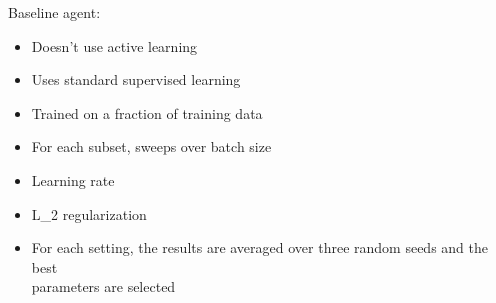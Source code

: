 \documentclass[preview]{standalone}
\begin{document}
\begin{center}
Baseline agent:
            \begin{itemize}
                \item Doesn't use active learning
                \item Uses standard supervised learning
                \item Trained on a fraction \psi {} of training data
                \item For each subset, sweeps over batch size 
                \item Learning rate 
                \item L_2 regularization 
                \item For each setting, the results are averaged over three random seeds and the best \\ parameters are selected
            \end{itemize}
\end{center}
\end{document}
